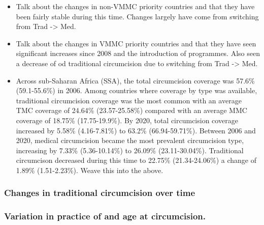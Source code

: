 \documentclass{article}
\begin{document}
\begin{itemize}
    \item {\color{red} Talk about the changes in non-VMMC priority countries and that they have been fairly stable during this time. Changes largely have come from switching from Trad -> Med.}
    \item {\color{red} Talk about the changes in VMMC priority countries and that they have seen significant increases since 2008 and the introduction of programmes. Also seen a decrease of od traditional circumcision due to switching from Trad -> Med.}
    \item Across sub-Saharan Africa (SSA), the total circumcision coverage was 57.6\% (59.1-55.6\%) in 2006. Among countries where coverage by type was available, traditional circumcision coverage was the most common with an average TMC coverage of 24.64\% (23.57-25.58\%) compared with an average MMC coverage of 18.75\% (17.75-19.9\%). By 2020, total circumcision coverage increased by 5.58\% (4.16-7.81\%) to 63.2\% (66.94-59.71\%). Between 2006 and 2020, medical circumcision became the most prevalent circumcision type, increasing by 7.33\% (5.36-10.14\%) to 26.09\% (23.11-30.04\%). Traditional circumcison decreased during this time to 22.75\% (21.34-24.06\%) a change of 1.89\% (1.51-2.23\%).{\color{red} Weave this into the above.}
\end{itemize}


\subsubsection*{Changes in traditional circumcision over time}



\subsubsection*{Variation in practice of and age at circumcision.}

\end{document}
